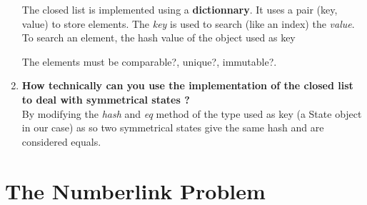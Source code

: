 \documentclass[10pt,a4paper]{article}
\begin{document}
\begin{enumerate}
	The closed list is implemented using a \textbf{dictionnary}. It uses a pair (key, value) to store elements. The \textit{key} is used to search (like an index) the \textit{value}. \\
	
	To search an element, the hash value of the object used as key 
	
	The elements must be comparable?, unique?, immutable?.
	
	\item \textbf{How technically can you use the implementation of the closed list to deal with symmetrical states ? }\\
	
	By modifying the \textit{hash} and \textit{eq} method of the type used as key (a State object in our case) as so two symmetrical states give the same hash and are considered equals.
		
\end{enumerate}

\section{The Numberlink Problem}
\end{document}
